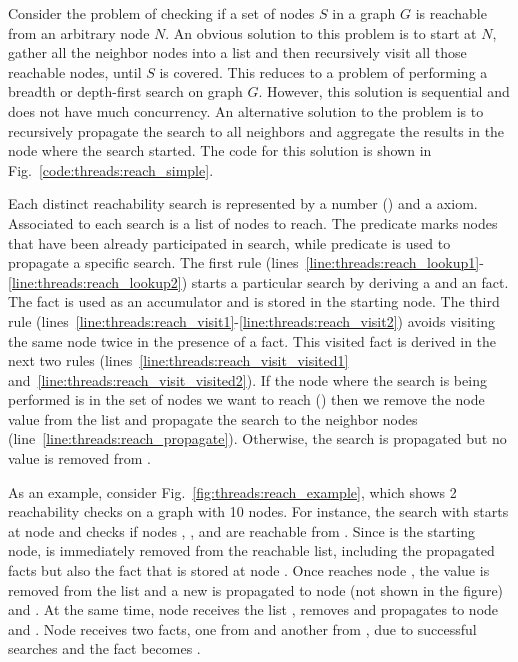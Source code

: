 Consider the problem of checking if a set of nodes $S$ in a graph $G$ is
reachable from an arbitrary node $N$. An obvious solution to this problem is to
start at $N$, gather all the neighbor nodes into a list and then recursively
visit all those reachable nodes, until $S$ is covered. This reduces to a
problem of performing a breadth or depth-first search on graph $G$. However,
this solution is sequential and does not have much concurrency.  An alternative
solution to the problem is to recursively propagate the search to all neighbors
and aggregate the results in the node where the search started.  The code for
this solution is shown in Fig.~\ref{code:threads:reach_simple}.

Each distinct reachability search is represented by a number () and a
 axiom. Associated to each search  is a list of nodes to
reach.  The predicate  marks nodes that have been already
participated in search, while predicate  is used to propagate a
specific search. The first rule
(lines~\ref{line:threads:reach_lookup1}-\ref{line:threads:reach_lookup2}) starts
a particular search by deriving a  and an  fact.
The  fact is used as an accumulator and is stored in the starting
node. The third rule
(lines~\ref{line:threads:reach_visit1}-\ref{line:threads:reach_visit2}) avoids
visiting the same node twice in the presence of a  fact.  This
visited fact is derived in the next two rules
(lines~\ref{line:threads:reach_visit_visited1}
and~\ref{line:threads:reach_visit_visited2}).  If the node where the search is
being performed is in the set of nodes we want to reach () then we
remove the node value from the list and propagate the search to the neighbor
nodes (line~\ref{line:threads:reach_propagate}).  Otherwise, the search is
propagated but no value is removed from .

As an example, consider Fig.~\ref{fig:threads:reach_example}, which shows 2
reachability checks on a graph with 10 nodes. For instance, the search with
 starts at node  and checks if nodes , ,
and  are reachable from . Since  is the starting
node,  is immediately removed from the reachable list, including the
propagated  facts but also the  fact that is stored
at node . Once  reaches node , the value
 is removed from the list and a new  is propagated to
node  (not shown in the figure) and . At the same time, node
 receives the list \code{[2,3]}, removes  and propagates
\code{[3]} to node  and . Node  receives two
 facts, one from  and another from , due to
successful searches and the  fact becomes .

